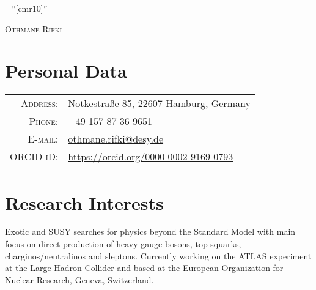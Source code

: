 \documentclass[a4paper,10pt]{article}
\begin{document}

\pagestyle{empty} %

\font\fb=''[cmr10]'' %

\par{\centering
		{\Huge \textsc{Othmane Rifki}
	}\bigskip\par}

\section{Personal Data}

\begin{tabular}{rl}
    \textsc{Address:}   					& Notkestraße 85, 22607 Hamburg, Germany		\\
    \textsc{Phone:}     						& +49 157 87 36 9651								\\
    \textsc{E-mail:}     						& \href{mailto:othmane.rifki@desy.de}{othmane.rifki@desy.de}	\\
    \textsc{ORCID iD:}						& \href{https://orcid.org/0000-0002-9169-0793}{https://orcid.org/0000-0002-9169-0793}
\end{tabular}

\vspace{3mm}
\section{Research Interests}
Exotic and SUSY searches for physics beyond the Standard Model with main focus on direct production of
heavy gauge bosons, top squarks, charginos/neutralinos and sleptons.
Currently working on the ATLAS experiment at the Large Hadron Collider and based at
the European Organization for Nuclear Research, Geneva, Switzerland.

\vspace{3mm}
\end{document}
